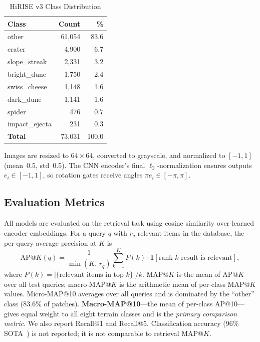 \documentclass[conference,a4paper]{IEEEtran}
\begin{document}
\begin{table}[t]
  \centering
  \caption{HiRISE v3 Class Distribution}
  \label{tab:dataset}
  \setlength{\tabcolsep}{5pt}
  \begin{tabular}{lrr}
    \toprule
    Class             & Count   & \% \\
    \midrule
    other             & 61,054  & 83.6 \\
    crater            &  4,900  &  6.7 \\
    slope\_streak     &  2,331  &  3.2 \\
    bright\_dune      &  1,750  &  2.4 \\
    swiss\_cheese     &  1,148  &  1.6 \\
    dark\_dune        &  1,141  &  1.6 \\
    spider            &    476  &  0.7 \\
    impact\_ejecta    &    231  &  0.3 \\
    \midrule
    \textbf{Total}    & 73,031  & 100.0 \\
    \bottomrule
  \end{tabular}
\end{table}

Images are resized to $64\times64$, converted to grayscale, and normalized
to $[-1,1]$ (mean~0.5, std~0.5).
The CNN encoder's final $\ell_2$-normalization ensures outputs
$e_i\in[-1,1]$, so rotation gates receive angles $\pi e_i\in[-\pi,\pi]$.

\subsection{Evaluation Metrics}
\label{sec:metrics}

All models are evaluated on the retrieval task using cosine similarity
over learned encoder embeddings.
For a query $q$ with $r_q$ relevant items in the database, the per-query
average precision at $K$ is
\begin{equation}
  \mathrm{AP}@K(q) = \frac{1}{\min(K,\,r_q)}
  \sum_{k=1}^{K} P(k)\cdot\mathbf{1}[\text{rank-}k\text{ result is relevant}],
  \label{eq:apk}
\end{equation}
where $P(k)=|\{\text{relevant items in top-}k\}|/k$.
MAP@$K$ is the mean of $\mathrm{AP}@K$ over all test queries;
macro-MAP@$K$ is the arithmetic mean of per-class MAP@$K$ values.
Micro-MAP@10 averages over all queries and is dominated by the ``other''
class (83.6\% of patches).
\textbf{Macro-MAP@10}—the mean of per-class AP@10—gives equal weight to all
eight terrain classes and is the \emph{primary comparison metric}.
We also report Recall@1 and Recall@5.
Classification accuracy (96\% SOTA~\cite{wagstaff2021mars}) is not reported;
it is not comparable to retrieval MAP@$K$.
\end{document}
